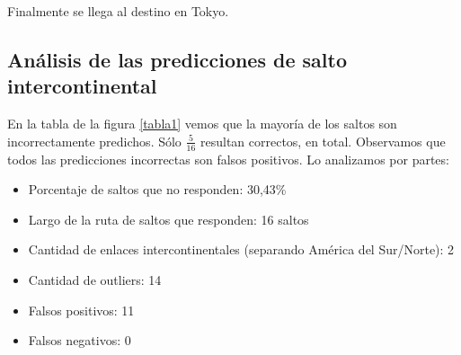 Finalmente se llega al destino en Tokyo.

\subsection{Análisis de las predicciones de salto intercontinental}

En la tabla de la figura \ref{tabla1} vemos que la mayoría de los saltos son incorrectamente predichos. Sólo $\frac{5}{16}$ resultan correctos, en total. Observamos que todos las predicciones incorrectas son falsos positivos. Lo analizamos por partes:

\begin{itemize}
	\item Porcentaje de saltos que no responden: 30,43\%
	\item Largo de la ruta de saltos que responden: 16 saltos 
	\item Cantidad de enlaces intercontinentales (separando América del Sur/Norte): 2
	\item Cantidad de outliers: 14
	\item Falsos positivos: 11
	\item Falsos negativos: 0
\end{itemize}

